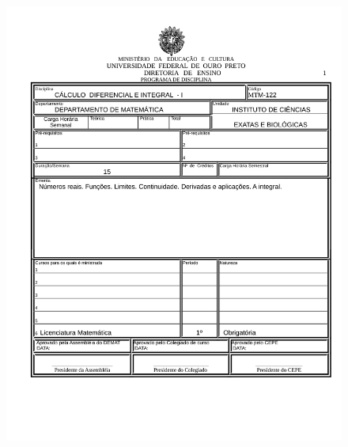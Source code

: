 \begin{figure}[p]
	\centering 
	\includegraphics[scale=0.7]{capitulos/anexo1-programas-disciplina/p14.pdf}
\end{figure}

